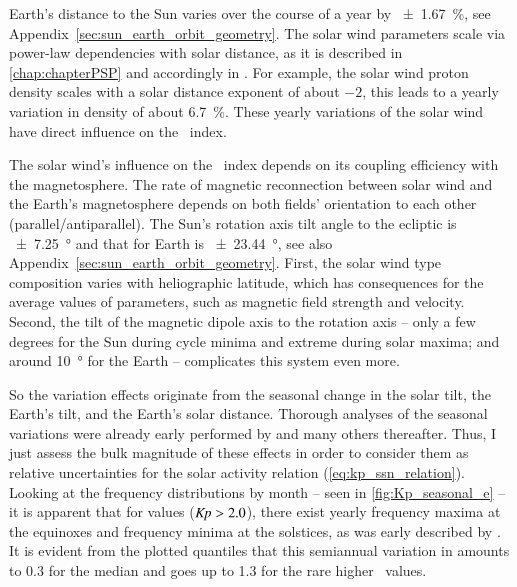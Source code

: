 Earth's distance to the Sun varies over the course of a year by \SI{+-1.67}{\percent}, see Appendix~\ref{sec:sun_earth_orbit_geometry}. The solar wind parameters scale via power-law dependencies with solar distance, as it is described in \autoref{chap:chapterPSP} and accordingly in \citet{Venzmer2018}. For example, the solar wind proton density scales with a solar distance exponent of about $-2$, this leads to a yearly variation in density of about \SI{6.7}{\percent}. These yearly variations of the solar wind have direct influence on the \Kp~index.

The solar wind's influence on the \Kp~index depends on its coupling efficiency with the magnetosphere. The rate of magnetic reconnection between solar wind and the Earth's magnetosphere depends on both fields' orientation to each other (parallel/antiparallel). The Sun's rotation axis tilt angle to the ecliptic is \SI{+-7.25}{\degree} and that for Earth is \SI{+-23.44}{\degree}, see also Appendix~\ref{sec:sun_earth_orbit_geometry}. First, the solar wind type composition varies with heliographic latitude, which has consequences for the average values of parameters, such as magnetic field strength and velocity. Second, the tilt of the magnetic dipole axis to the rotation axis -- only a few degrees for the Sun during cycle minima and extreme during solar maxima; and around \SI{10}{\degree} for the Earth -- complicates this system even more.

So the \Kp{} variation effects originate from the seasonal change in the solar tilt, the Earth's tilt, and the Earth's solar distance. Thorough analyses of the seasonal variations were already early performed by \citet{Cortie1912} and many others thereafter. Thus, I just assess the bulk magnitude of these effects in order to consider them as relative uncertainties for the solar activity relation (\ref{eq:kp_ssn_relation}). Looking at the \Kp{} frequency distributions by month -- seen in \autoref{fig:Kp_seasonal_e} -- it is apparent that for values ($\textit{Kp}{} > 2.0$), there exist yearly frequency maxima at the equinoxes and frequency minima at the solstices, as was early described by \citet{Cortie1912}. It is evident from the plotted quantiles that this semiannual variation in \Kp{} amounts to \num{0.3} for the median \Kp{} and goes up to \num{1.3} for the rare higher \Kp~values.

